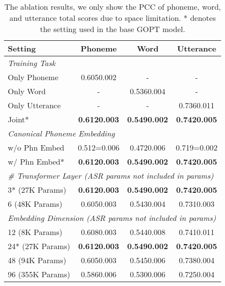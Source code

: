 \documentclass{article}
\begin{document}
\begin{table}[t]
\centering
\small
\setlength\tabcolsep{4.3pt}
\begin{tabular}{@{}lccc@{}}
\toprule
Setting         & Phoneme                & Word                 & Utterance            \\ \midrule
\multicolumn{4}{l}{\textit{Training Task}}                                                \\ \midrule
Only Phoneme      & 0.6050.002          & -                     & -                     \\
Only Word       & -                     & 0.5360.004          & -                     \\
Only Utterance  & -                     & -                     & 0.7360.011          \\
Joint*          & \textbf{0.6120.003} & \textbf{0.5490.002} & \textbf{0.7420.005} \\ \midrule
\multicolumn{4}{l}{\textit{Canonical Phoneme Embedding}}                                            \\ \midrule
w/o Phn Embed   & 0.512=0.006           & 0.4720.006          & 0.719=0.002           \\
w/ Phn Embed*    & \textbf{0.6120.003} & \textbf{0.5490.002} & \textbf{0.7420.005} \\ \midrule
\multicolumn{4}{l}{\textit{\# Transformer Layer (ASR params not included in params)}}                                       \\ \midrule
3* (27K Params)  & \textbf{0.6120.003} & \textbf{0.5490.002} & \textbf{0.7420.005} \\
6 (48K Params)  & 0.6050.003          & 0.5430.004          & 0.7310.003          \\ \midrule
\multicolumn{4}{l}{\textit{Embedding Dimension (ASR params not included in params)}}                            \\ \midrule
12 (8K Params)  & 0.6080.003          & 0.5440.008          & 0.7410.011          \\
24* (27K Params) & \textbf{0.6120.003} & \textbf{0.5490.002} & \textbf{0.7420.005} \\
48 (94K Params) & 0.6050.003          & 0.5450.006          & 0.7380.004          \\
96 (355K Params) & 0.5860.006          & 0.5300.006          & 0.7250.004          \\ \bottomrule
\end{tabular}
\caption{The ablation results, we only show the PCC of phoneme, word, and utterance total scores due to space limitation. * denotes the setting used in the base GOPT model.}
\label{tab:ablation}
\end{table}
\end{document}
